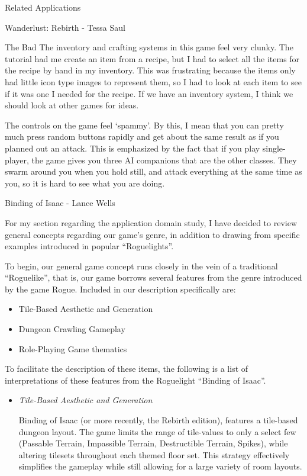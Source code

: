 \documentclass[12pt]{report}
\begin{document}
\begin{section}{Related Applications}
\begin{subsection}{Wanderlust: Rebirth - Tessa Saul}
\begin{subsubsection}{The Bad}
The inventory and crafting systems in this game feel very clunky. The
tutorial had me create an item from a recipe, but I had to select all the
items for the recipe by hand in my inventory. This was frustrating because
the items only had little icon type images to represent them, so I had to
look at each item to see if it was one I needed for the recipe. If we have
an inventory system, I think we should look at other games for ideas. 

The controls on the game feel `spammy'. By this, I mean that you can pretty
much press random buttons rapidly and get about the same result as if you
planned out an attack. This is emphasized by the fact that if you play
single-player, the game gives you three AI companions that are the other
classes. They swarm around you when you hold still, and attack everything
at the same time as you, so it is hard to see what you are doing. 
\end{subsubsection}
\end{subsection}

\begin{subsection}{Binding of Isaac - Lance Wells}

For my section regarding the application domain study, I have decided to
review general concepts regarding our game's genre, in addition to drawing
from specific examples introduced in popular ``Roguelights''.

To begin, our general game concept runs closely in the vein of a
traditional ``Roguelike'', that is, our game borrows several features from
the genre introduced by the game Rogue. Included in our description
specifically are:

\begin{itemize}
\item Tile-Based Aesthetic and Generation
\item Dungeon Crawling Gameplay
\item Role-Playing Game thematics
\end{itemize}

To facilitate the description of these items, the following is a list of
interpretations of these features from the Roguelight ``Binding of Isaac''.

\begin{itemize}
\item \emph{Tile-Based Aesthetic and Generation}

Binding of Isaac (or more recently, the Rebirth edition), features a
tile-based dungeon layout. The game limits the range of tile-values to only
a select few (Passable Terrain, Impassible Terrain, Destructible Terrain,
Spikes), while altering tilesets throughout each themed floor set. This
strategy effectively simplifies the gameplay while still allowing for a
large variety of room layouts.


\end{itemize}
\end{subsection}
\end{section}
\end{document}
